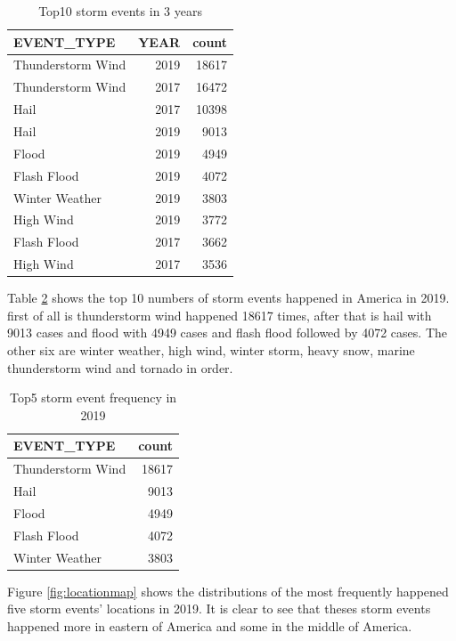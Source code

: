 \documentclass[
]{article}
\begin{document}
\begin{table}[!h]

\caption{\label{tab:stormtb}Top10 storm events in 3 years }
\centering
\begin{tabular}[t]{l|r|r}
\hline
EVENT\_TYPE & YEAR & count\\
\hline
Thunderstorm Wind & 2019 & 18617\\
\hline
Thunderstorm Wind & 2017 & 16472\\
\hline
Hail & 2017 & 10398\\
\hline
Hail & 2019 & 9013\\
\hline
Flood & 2019 & 4949\\
\hline
Flash Flood & 2019 & 4072\\
\hline
Winter Weather & 2019 & 3803\\
\hline
High Wind & 2019 & 3772\\
\hline
Flash Flood & 2017 & 3662\\
\hline
High Wind & 2017 & 3536\\
\hline
\end{tabular}
\end{table}

Table \ref{tab:countstb} shows the top 10 numbers of storm events happened in America in 2019. first of all is thunderstorm wind happened 18617 times, after that is hail with 9013 cases and flood with 4949 cases and flash flood followed by 4072 cases. The other six are winter weather, high wind, winter storm, heavy snow, marine thunderstorm wind and tornado in order.

\begin{table}[!h]

\caption{\label{tab:countstb}Top5 storm event frequency in 2019}
\centering
\begin{tabular}[t]{l|r}
\hline
EVENT\_TYPE & count\\
\hline
Thunderstorm Wind & 18617\\
\hline
Hail & 9013\\
\hline
Flood & 4949\\
\hline
Flash Flood & 4072\\
\hline
Winter Weather & 3803\\
\hline
\end{tabular}
\end{table}

\clearpage

Figure \ref{fig:locationmap} shows the distributions of the most frequently happened five storm events' locations in 2019. It is clear to see that theses storm events happened more in eastern of America and some in the middle of America.
\end{document}
